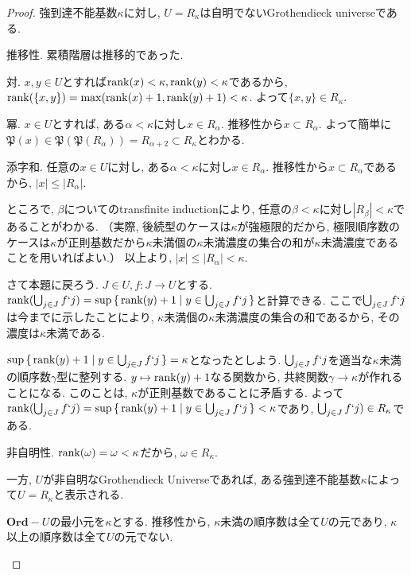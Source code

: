\documentclass[a4paper, twoside]{bxjsarticle}
\newcommand{\abs}[1]{\left\lvert#1\right\rvert}
\theoremstyle{definition}
\begin{document}
        \begin{proof}
            強到達不能基数$\kappa$に対し, $U=R_\kappa$は自明でないGrothendieck universeである.
            \begin{framed}
                推移性. 累積階層は推移的であった. 
                
                対. $x, y\in U$とすれば${\rm rank}(x)<\kappa, {\rm rank}(y)<\kappa$であるから, ${\rm rank}(\{x, y\})={\rm max}({\rm rank}(x)+1, {\rm rank}(y)+1)<\kappa$. よって$\{x, y\}\in R_\kappa$.
                
                冪. $x\in U$とすれば, ある$\alpha<\kappa$に対し$x\in R_\alpha$. 推移性から$x\subset R_\alpha$. よって簡単に$\mathfrak{P}(x)\in \mathfrak{P}(\mathfrak{P}(R_\alpha))=R_{\alpha+2}\subset R_\kappa$とわかる.
                
                添字和. 任意の$x\in U$に対し, ある$\alpha<\kappa$に対し$x\in R_\alpha$. 推移性から$x\subset R_\alpha$であるから, $\abs{x}\leq\abs{R_\alpha}$.
                
                ところで, $\beta$についてのtransfinite inductionにより, 任意の$\beta<\kappa$に対し$\abs{R_\beta}<\kappa$であることがわかる. （実際,  後続型のケースは$\kappa$が強極限的だから, 極限順序数のケースは$\kappa$が正則基数だから$\kappa$未満個の$\kappa$未満濃度の集合の和が$\kappa$未満濃度であることを用いればよい.） 以上より, $\abs{x}\leq\abs{R_\alpha}<\kappa$. 
                
                さて本題に戻ろう. $J\in U, f\colon J\to U$とする. ${\rm rank}(\bigcup_{j\in J}f`j)={\rm sup}\set{{\rm rank}(y)+1|y\in \bigcup_{j\in J}f`j}$と計算できる. ここで$\bigcup_{j\in J}f`j$は今までに示したことにより, $\kappa$未満個の$\kappa$未満濃度の集合の和であるから, その濃度は$\kappa$未満である.
                
                ${\rm sup}\set{{\rm rank}(y)+1|y\in \bigcup_{j\in J}f`j}=\kappa$となったとしよう. $\bigcup_{j\in J}f`j$を適当な$\kappa$未満の順序数$\gamma$型に整列する. $y\mapsto {\rm rank}(y)+1$なる関数から, 共終関数$\gamma\to\kappa$が作れることになる. このことは, $\kappa$が正則基数であることに矛盾する.  よって${\rm rank}(\bigcup_{j\in J}f`j)={\rm sup}\set{{\rm rank}(y)+1|y\in \bigcup_{j\in J}f`j}<\kappa$であり, $\bigcup_{j\in J}f`j)\in R_\kappa$である.
                
                非自明性. ${\rm rank}(\omega)=\omega<\kappa$だから, $\omega\in R_\kappa$.
            \end{framed}
            
            一方, $U$が非自明なGrothendieck Universeであれば, ある強到達不能基数$\kappa$によって$U=R_\kappa$と表示される.
            \begin{framed}
                $\textbf{Ord}-U$の最小元を$\kappa$とする. 推移性から, $\kappa$未満の順序数は全て$U$の元であり, $\kappa$以上の順序数は全て$U$の元でない.
                

\end{framed}
\end{proof}
\end{document}
